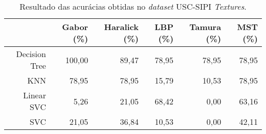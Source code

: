 \begin{table}[H]
    \centering
    \caption[Resultado das acurácias obtidas no \textit{dataset} USC-SIPI \textit{Textures}]{Resultado das acurácias obtidas no \textit{dataset} USC-SIPI \textit{Textures}.
    \label{tab:uscSipiAcuracias}}
    \begin{tabular}{rrrrrr}
        \toprule
            & Gabor (\%) & Haralick (\%) & LBP (\%) & Tamura (\%) & MST (\%) \\
        \midrule
            Decision Tree & 100,00 & 89,47 & 78,95 & 78,95 & 78,95 \\
            KNN & 78,95 & 78,95 & 15,79 & 10,53 & 78,95 \\
            Linear SVC & 5,26 & 21,05 & 68,42 & 0,00 & 63,16 \\
            SVC & 21,05 & 36,84 & 10,53 & 0,00 & 42,11 \\
        \bottomrule
    \end{tabular}
\end{table}
